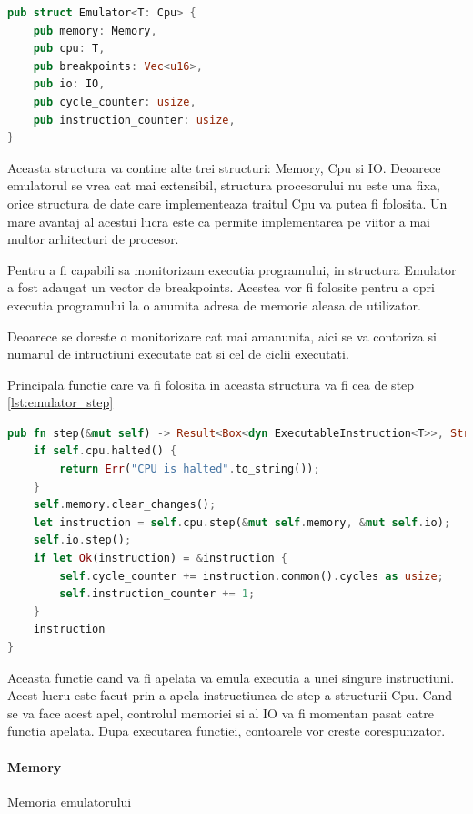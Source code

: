 \documentclass[titlepage,12pt]{article}
\DeclareRobustCommand{\code}[1]{{\ttfamily\small #1}}
\begin{document}
\begin{lstlisting}[language=Rust,caption={Structura Emulator},label={lst:emulator_struct}]
pub struct Emulator<T: Cpu> {
    pub memory: Memory,
    pub cpu: T,
    pub breakpoints: Vec<u16>,
    pub io: IO,
    pub cycle_counter: usize,
    pub instruction_counter: usize,
}
\end{lstlisting}

Aceasta structura va contine alte trei structuri: \code{Memory}, \code{Cpu} si \code{IO}. Deoarece emulatorul se vrea cat mai extensibil, structura procesorului nu este una fixa, orice structura de date care implementeaza traitul \code{Cpu} va putea fi folosita. Un mare avantaj al acestui lucra este ca permite implementarea pe viitor a mai multor arhitecturi de procesor.

Pentru a fi capabili sa monitorizam executia programului, in structura \code{Emulator} a fost adaugat un vector de breakpoints. Acestea vor fi folosite pentru a opri executia programului la o anumita adresa de memorie aleasa de utilizator.

Deoarece se doreste o monitorizare cat mai amanunita, aici se va contoriza si numarul de intructiuni executate cat si cel de ciclii executati.

Principala functie care va fi folosita in aceasta structura va fi cea de step \cref{lst:emulator_step}

\begin{lstlisting}[language=Rust,caption={Functia step a emulatorului},label={lst:emulator_step}]
pub fn step(&mut self) -> Result<Box<dyn ExecutableInstruction<T>>, String> {
    if self.cpu.halted() {
        return Err("CPU is halted".to_string());
    }
    self.memory.clear_changes();
    let instruction = self.cpu.step(&mut self.memory, &mut self.io);
    self.io.step();
    if let Ok(instruction) = &instruction {
        self.cycle_counter += instruction.common().cycles as usize;
        self.instruction_counter += 1;
    }
    instruction
}
\end{lstlisting}
Aceasta functie cand va fi apelata va emula executia a unei singure instructiuni. Acest lucru este facut prin a apela instructiunea de step a structurii \code{Cpu}. Cand se va face acest apel, controlul memoriei si al \code{IO} va fi momentan pasat catre functia apelata. Dupa executarea functiei, contoarele vor creste corespunzator.

\paragraph{\code{Memory}} Memoria emulatorului
\end{document}
